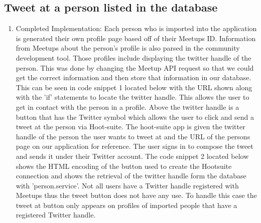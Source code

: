 \documentclass[draftclsnofoot,10pt,onecolumn]{IEEEtran} %
\begin{document}
\subsection{Tweet at a person listed in the database}
\begin{enumerate}
  \item Completed Implementation: Each person who is imported into the application
    is generated their own profile page based off of their Meetups ID. Information from 
    Meetups about the person’s profile is also parsed in the community development tool. Those profiles
    include displaying the twitter handle of the person. This was done by changing
    the Meetup API request so that we could get the correct information and
    then store that information in our database. This can be seen in code snippet 1 located below 
    with the URL shown along with the 'if' statements to locate the twitter handle. This allows the user to get 
    in contact with the person in a profile. Above the
    twitter handle is a button that has the Twitter symbol which allows the user
    to click and send a tweet at the person via Hoot-suite. The hoot-suite app is
    given the twitter handle of the person the user wants to tweet at and the URL
    of the persons page on our application for reference. The user signs in to
    compose the tweet and sends it under their Twitter account. The code snippet 2 located below 
    shows the HTML encoding of the button used to create the Hootsuite connection and shows the 
    retrieval of the twitter handle form the database with 'person.service'. Not all users have a
    Twitter handle registered with Meetups thus the tweet button does not have any use. To handle this case
    the tweet at button only appears on profiles of imported people that have a registered Twitter handle.
          


\end{enumerate}
\end{document}
